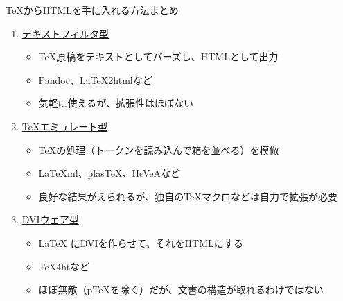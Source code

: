 \begin{frame}[t]{\inhibitglue \TeX{}からHTMLを手に入れる方法まとめ}
  \sffamily

  \begin{enumerate}
    \item[\sffamily\color{black}{１.}] \underline{テキストフィルタ型}\\
    \begin{itemize}
      \item \TeX{}原稿をテキストとしてパーズし、HTMLとして出力
      \item Pandoc、\LaTeX{}2htmlなど
      \item 気軽に使えるが、拡張性はほぼない
    \end{itemize}
    \item[\sffamily\color{black}{２.}] \underline{TeXエミュレート型}\\
    \begin{itemize}
      \item \TeX{}の処理（トークンを読み込んで箱を並べる）を模倣
      \item \LaTeX{}ml、plas\TeX{}、HeVeAなど
      \item 良好な結果がえられるが、独自のTeXマクロなどは自力で拡張が必要
    \end{itemize}
    \item[\sffamily\color{black}{３.}] \underline{DVIウェア型}\\
    \begin{itemize}
      \item \LaTeX{} にDVIを作らせて、それをHTMLにする
      \item \TeX{}4htなど
      \item ほぼ無敵（p\TeX{}を除く）だが、文書の構造が取れるわけではない
    \end{itemize}
  \end{enumerate}
\end{frame}


